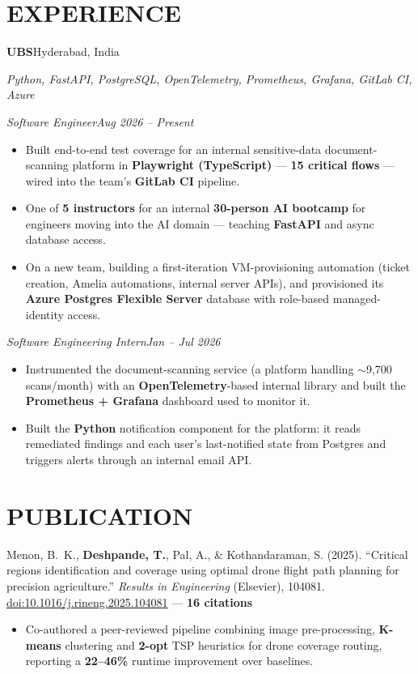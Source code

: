 \documentclass[10pt,a4paper]{article}
\newcommand{\entry}[2]{\noindent\textbf{#1}\hfill{\color{muted}#2}\par}
\newcommand{\subentry}[2]{\noindent\textit{#1}\hfill\textit{#2}\par}
\begin{document}
\section*{EXPERIENCE}

\entry{UBS}{Hyderabad, India}
{\small\textit{Python, FastAPI, PostgreSQL, OpenTelemetry, Prometheus, Grafana, GitLab CI, Azure}\par}
\vspace{1pt}
\subentry{Software Engineer}{Aug 2026 -- Present}
{\small
\begin{itemize}
  \item Built end-to-end test coverage for an internal sensitive-data document-scanning platform in \textbf{Playwright (TypeScript)} --- \textbf{15 critical flows} --- wired into the team's \textbf{GitLab CI} pipeline.
  \item One of \textbf{5 instructors} for an internal \textbf{30-person AI bootcamp} for engineers moving into the AI domain --- teaching \textbf{FastAPI} and async database access.
  \item On a new team, building a first-iteration VM-provisioning automation (ticket creation, Amelia automations, internal server APIs), and provisioned its \textbf{Azure Postgres Flexible Server} database with role-based managed-identity access.
\end{itemize}
}

\vspace{3pt}
\subentry{Software Engineering Intern}{Jan -- Jul 2026}
{\small
\begin{itemize}
  \item Instrumented the document-scanning service (a platform handling $\sim$9{,}700 scans/month) with an \textbf{OpenTelemetry}-based internal library and built the \textbf{Prometheus + Grafana} dashboard used to monitor it.
  \item Built the \textbf{Python} notification component for the platform: it reads remediated findings and each user's last-notified state from Postgres and triggers alerts through an internal email API.
\end{itemize}
}

\section*{PUBLICATION}
{\small Menon, B.~K., \textbf{Deshpande, T.}, Pal, A., \& Kothandaraman, S. (2025). ``Critical regions identification and coverage using optimal drone flight path planning for precision agriculture.'' \textit{Results in Engineering} (Elsevier), 104081. \href{https://doi.org/10.1016/j.rineng.2025.104081}{doi:10.1016/j.rineng.2025.104081} --- \textbf{16 citations}
\begin{itemize}
  \item Co-authored a peer-reviewed pipeline combining image pre-processing, \textbf{K-means} clustering and \textbf{2-opt} TSP heuristics for drone coverage routing, reporting a \textbf{22--46\%} runtime improvement over baselines.
\end{itemize}
}
\end{document}

